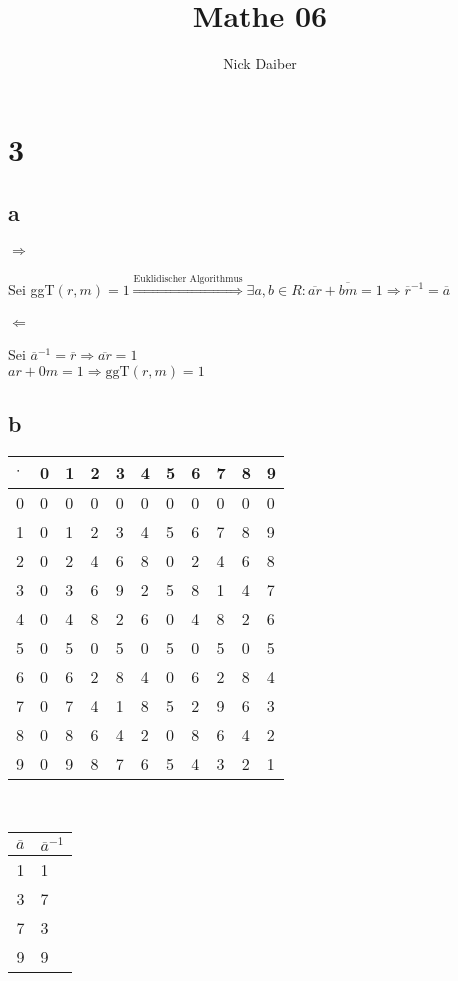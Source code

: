 \documentclass{article}
\author{Nick Daiber}
\title{Mathe 06}
\begin{document}
\maketitle
\section*{3}
\subsection*{a}
\paragraph{$\Rightarrow$\\}
Sei ggT$(r, m) = 1 
\overset{\text{Euklidischer Algorithmus}}{\Rightarrow}
\exists a,b \in R: \overline{ar} +
\overline{bm} = 1\Rightarrow \overline{r}^{-1}=\overline{a}$
\paragraph{$\Leftarrow$\\}
Sei $\overline{a}^{-1}=\overline{r} \Rightarrow \overline{ar}= 1$\\
$ar + 0m = 1\Rightarrow \text{ggT}(r,m)=1$
\subsection*{b}
\begin{tabular}{l|llllllllll}
    $\cdot$&0&1&2&3&4&5&6&7&8&9\\
    \hline
    0&0&0&0&0&0&0&0&0&0&0\\
    1&0& 
    \color{teal}
    1&2&3&4&5&6&7&8&9\\

    2&0&2&4&6&8&0&2&4&6&8\\
    3&0&3&6&9&2&5&8&
    \color{teal}
    1&4&7\\
    4&0&4&8&2&6&0&4&8&2&6\\
    5&0&5&0&5&0&5&0&5&0&5\\
    6&0&6&2&8&4&0&6&2&8&4\\
    7&0&7&4&
    \color{teal}
    1&8&5&2&9&6&3\\
    8&0&8&6&4&2&0&8&6&4&2\\
    9&0&9&8&7&6&5&4&3&2&
    \color{teal}
    1\\
\end{tabular}\\
\begin{tabular}{r|l}
    $\overline{a}$&$\overline{a}^{-1}$\\
    \hline
    1&1\\
    3&7\\
    7&3\\
    9&9
\end{tabular}
\end{document}
